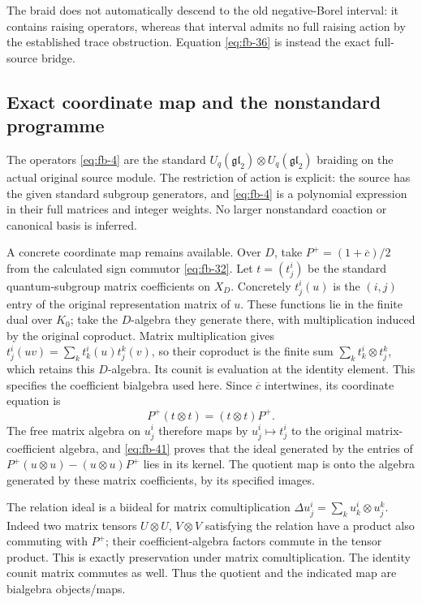 The braid does not automatically descend to the old negative-Borel
interval: it contains raising operators, whereas that interval
admits no full raising action by the established trace obstruction.
Equation \eqref{eq:fb-36} is instead the exact full-source bridge.

\subsection{Exact coordinate map and the nonstandard programme}
\label{sec:fb-coordinates}

The operators \eqref{eq:fb-4} are the standard
\(U_q(\mathfrak{gl}_2)\otimes U_q(\mathfrak{gl}_2)\) braiding on the
actual original source module. The restriction of action is explicit:
the source has the given standard subgroup generators, and \eqref{eq:fb-4} is
a polynomial expression in their full matrices and integer weights.
No larger nonstandard coaction or canonical basis is inferred.

A concrete coordinate map remains available. Over \(D\), take
\(P^+=(1+\overline c)/2\) from the calculated sign commutor \eqref{eq:fb-32}.
Let \(t=(t^i_j)\) be the standard quantum-subgroup matrix coefficients
on \(X_D\). Concretely \(t^i_j(u)\) is the \((i,j)\) entry of the
original representation matrix of \(u\). These functions lie in the
finite dual over \(K_0\); take the \(D\)-algebra they generate there,
with multiplication induced by the original coproduct. Matrix
multiplication gives
\(t^i_j(uv)=\sum_k t^i_k(u)t^k_j(v)\), so their coproduct is the finite
sum \(\sum_k t^i_k\otimes t^k_j\), which retains this \(D\)-algebra.
Its counit is evaluation at the identity element. This specifies the
coefficient bialgebra used here. Since \(\overline c\) intertwines,
its coordinate equation is
\begin{equation}\tag{FB41}\label{eq:fb-41}
P^+(t\otimes t)=(t\otimes t)P^+.
\end{equation}
The free matrix algebra on \(u^i_j\) therefore maps by
\(u^i_j\mapsto t^i_j\) to the original matrix-coefficient algebra,
and \eqref{eq:fb-41} proves that the ideal generated by the entries of
\(P^+(u\otimes u)-(u\otimes u)P^+\) lies in its kernel.
The quotient map is onto the algebra generated by these matrix
coefficients, by its specified images.

The relation ideal is a biideal for matrix comultiplication
\(\Delta u^i_j=\sum_k u^i_k\otimes u^k_j\). Indeed two matrix tensors
\(U\otimes U\), \(V\otimes V\) satisfying the relation have a product
also commuting with \(P^+\); their coefficient-algebra factors commute
in the tensor product. This is exactly preservation under matrix
comultiplication. The identity counit matrix commutes as well.
Thus the quotient and the indicated map are bialgebra objects/maps.

